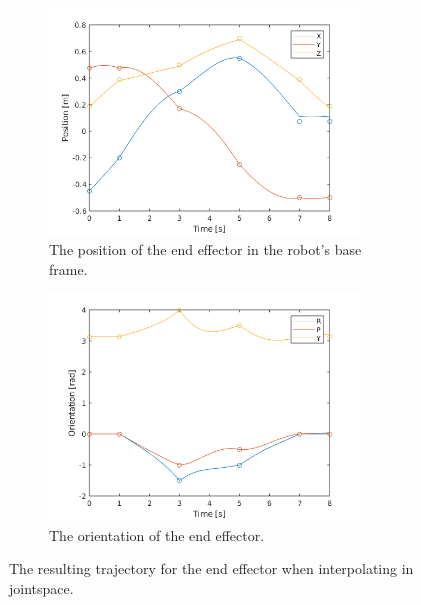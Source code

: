 \documentclass[../main.tex]{subfiles}
\begin{document}
\begin{figure}[h]
    \centering
    \begin{subfigure}[t]{0.45\textwidth}
        \centering
        \captionsetup{width=.9\textwidth}
        \includegraphics[width=0.9\textwidth]{figures/p2p_interpolation/d_joint_space_int_without_blend_position.png}
        \caption{The position of the end effector in the robot's base frame.}
        \label{}
    \end{subfigure}
    \begin{subfigure}[t]{0.45\textwidth}
        \centering
        \captionsetup{width=.9\textwidth}
        \includegraphics[width=0.9\textwidth]{figures/p2p_interpolation/d_joint_space_int_without_blend_orientation.png}
        \caption{The orientation of the end effector.}
        \label{}
    \end{subfigure}
    \caption{The resulting trajectory for the end effector when interpolating in jointspace.}
    \label{fig:p2p_int}
\end{figure}
\end{document}
